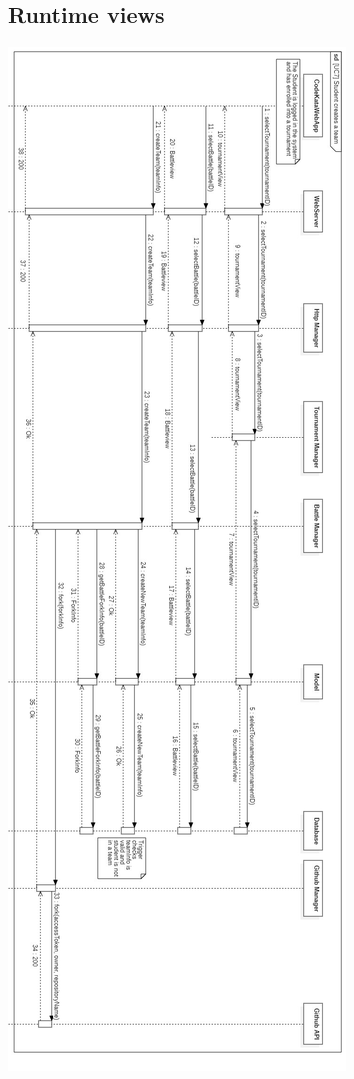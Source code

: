 \documentclass{article}
\begin{document}
\subsection{Runtime views}
\begin{center}
    \includegraphics[angle=-90,width=0.4\linewidth]{uc7.jpg}
  \label{fig:uc7}
\end{center}
\end{document}
